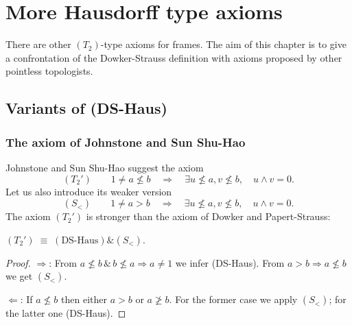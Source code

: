 \chapter{More Hausdorff type axioms}

There are other $(T_2)$-type axioms for frames.
The aim of this chapter is to give a confrontation of the Dowker-Strauss
definition with axioms proposed by other pointless topologists.

\section{Variants of (DS-Haus)}

\subsection{The axiom of Johnstone and Sun Shu-Hao}

Johnstone and Sun Shu-Hao \cite{johnstone-shu-hao} suggest the axiom
\[
  (T_2') \qquad
  1 \ne a\not\le b \quad \Rightarrow \quad \exists u\not\leq a, v\not\leq b,
  \quad u \wedge v = 0.
\]
Let us also introduce its weaker version
\[
  (S_<) \qquad
  1 \ne a > b \quad \Rightarrow \quad \exists u\not\leq a, v\not\leq b,
  \quad u \wedge v = 0.
\]
The axiom $(T_2')$ is stronger than the axiom of Dowker and Papert-Strauss:
\begin{prop} \label{prop:T2'=DS-Haus+S<}
  $(T_2') \; \equiv \; (\text{DS-Haus}) \& (S_<)$.
\end{prop}
\begin{proof}
  $\Rightarrow$:
  From $a\not\le b \, \& \,  b\not\le a \Rightarrow a \ne 1$ we infer
  (DS-Haus).
  From $a > b \Rightarrow a \not\le b$ we get $(S_<)$.

  $\Leftarrow$:
  If $a \not\le b$ then either $a > b$ or $a\not\ge b$.
  For the former case we apply $(S_<)$; for the latter one (DS-Haus).
\end{proof}

